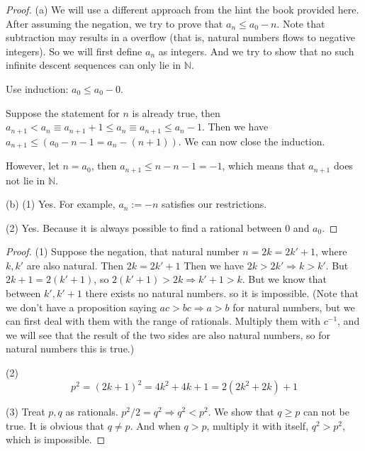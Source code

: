 \begin{proof}
(a) We will use a different approach from the hint the book provided here. After assuming the negation, we 
try to prove that 
$a_n \leq a_0 -n$. Note that subtraction may results in a overflow (that is, natural numbers flows to negative 
integers). So we will first define $a_n$ as integers. And we try to show that no such infinite descent 
sequences can only lie in  $\mathbb{N}$.

Use induction: $a_0 \leq a_0-0$.

Suppose the statement for $n$ is already true, then 
$a_{n+1} < a_n \equiv a_{n+1} +1 \leq a_n \equiv a_{n+1} \leq a_n - 1$. Then we have 
$a_{n+1} \leq (a_0 -n -1 = a_n -(n+1))$. We can now close the induction.

However, let $n = a_0$, then $a_{n+1} \leq n-n-1 = -1$, which means that $a_{n+1}$ does not lie in 
$\mathbb{N}$.

(b)
(1) Yes. For example, $a_n:=-n$ satisfies our restrictions.

(2) Yes. Because it is always possible to find a rational between $0$ and $a_0$.
\end{proof}

\begin{proof}
(1) Suppose the negation, that natural number $n=2k=2k'+1$, where $k,k'$ are also natural. Then $2k=2k'+1$
Then we have $2k > 2k' \Longrightarrow k>k'$. But $2k+1 = 2(k'+1)$, so $2(k'+1) > 2k \Longrightarrow k'+1 >k$. 
But we know that between $k',k'+1$ there exists no natural numbers. so it is impossible. (Note that we don't 
have a proposition saying $ac>bc \Longrightarrow a>b$ for natural numbers, but we can first deal with them with 
the range of rationals. Multiply them with $c^{-1}$, and we will see that the result of the two sides are also 
natural numbers, so for natural numbers this is true.)

(2)
\[
p^2 = (2k+1)^2 = 4k^2+4k + 1 = 2(2k^2+2k) +1
\]

(3)
Treat $p,q$ as rationals.
$p^2/2=q^2 \Longrightarrow q^2<p^2$. We show that $q \geq p$ can not be true. It is obvious that $q \neq p$. 
And when $q>p$, multiply it with itself, $q^2>p^2$, which is impossible.
\end{proof}
